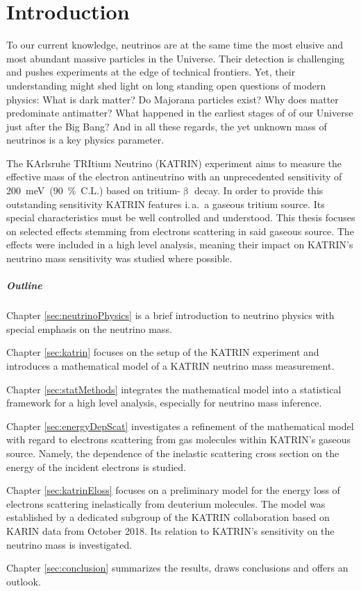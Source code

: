 \chapter{Introduction}
To our current knowledge, neutrinos are at the same time the most elusive and most abundant massive particles in the Universe. Their detection is challenging and pushes experiments at the edge of technical frontiers. Yet, their understanding might shed light on long standing open questions of modern physics: What is dark matter? Do Majorana particles exist? Why does matter predominate antimatter? What happened in the earliest stages of of our Universe just after the Big Bang? And in all these regards, the yet unknown mass of neutrinos is a key physics parameter.

The KArlsruhe TRItium Neutrino (KATRIN) experiment aims to measure the effective mass of the electron antineutrino with an unprecedented sensitivity of \mbox{\SI{200}{meV} (\SI{90}{\percent} C.L.)} based on tritium-$\upbeta$ decay. In order to provide this outstanding sensitivity KATRIN features i.\,a.~a gaseous tritium source. Its special characteristics must be well controlled and understood. This thesis focuses on selected effects stemming from electrons scattering in said gaseous source. The effects were included in a high level analysis, meaning their impact on KATRIN's neutrino mass sensitivity was studied where possible.

\paragraph{Outline}
Chapter \ref{sec:neutrinoPhysics} is a brief introduction to neutrino physics with special emphasis on the neutrino mass.

Chapter \ref{sec:katrin} focuses on the setup of the KATRIN experiment and introduces a mathematical model of a KATRIN neutrino mass measurement.

Chapter \ref{sec:statMethods} integrates the mathematical model into a statistical framework for a high level analysis, especially for neutrino mass inference.

Chapter \ref{sec:energyDepScat} investigates a refinement of the mathematical model with regard to electrons scattering from gas molecules within KATRIN's gaseous source. Namely, the dependence of the inelastic scattering cross section on the energy of the incident electrons is studied.

Chapter \ref{sec:katrinEloss} focuses on a preliminary model for the energy loss of electrons scattering inelastically from deuterium molecules. The model was established by a dedicated subgroup of the KATRIN collaboration based on KARIN data from October 2018. Its relation to KATRIN's sensitivity on the neutrino mass is investigated.

Chapter \ref{sec:conclusion} summarizes the results, draws conclusions and offers an outlook.